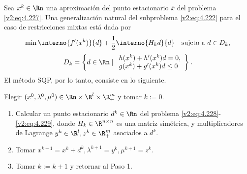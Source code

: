 Sea $x^k \in \Rn$ una aproximación del punto estacionario $\bar{x}$ del problema \eqref{v2:eq:4.227}. Una generalización natural del subproblema \eqref{v2:eq:4.222} para el caso de restricciones mixtas está dada por
\begin{equation}
\min \interno{f'(x^k)}{d} + \frac{1}{2} \interno{H_k d}{d} \quad \text{sujeto a } d \in D_k,
\label{v2:eq:4.228}
\end{equation}
\begin{equation}
D_k = \left\{ d \in \Rn \mid \begin{array}{l} h(x^k) + h'(x^k)d = 0, \\ g(x^k) + g'(x^k)d \le 0 \end{array} \right\}.
\label{v2:eq:4.229}
\end{equation}
El método SQP, por lo tanto, consiste en lo siguiente.

\begin{algorithm}
\label{v2:alg:4.6.2}
Elegir $(x^0, \lambda^0, \mu^0) \in \Rn \times \R^l \times \R^m_+$ y tomar $k := 0$.
\begin{enumerate}
    \item Calcular un punto estacionario $d^k \in \Rn$ del problema \eqref{v2:eq:4.228}-\eqref{v2:eq:4.229}, donde $H_k \in \R^{n \times n}$ es una matriz simétrica, y multiplicadores de Lagrange $y^k \in \R^l, z^k \in \R^m_+$ asociados a $d^k$.
    \item Tomar $x^{k+1} = x^k + d^k, \lambda^{k+1} = y^k, \mu^{k+1} = z^k$.
    \item Tomar $k := k + 1$ y retornar al Paso 1.
\end{enumerate}
\end{algorithm}

